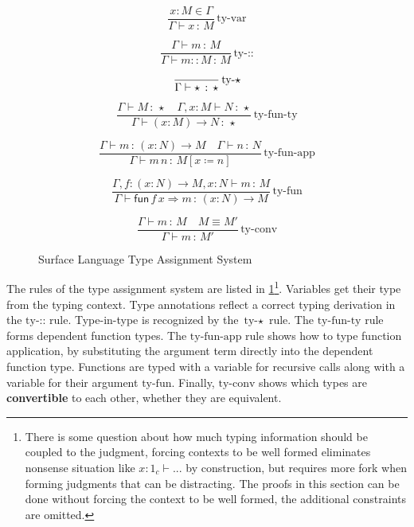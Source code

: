 

\begin{figure}
\[
\frac{x:M\in\Gamma}{\Gamma\vdash x\,:\,M}\,\textrm{ty-var}
\]

\[
\frac{\Gamma\vdash m\,:\,M}{\Gamma\vdash m::M\,:\,M}\,\textrm{ty-::}
\]

\[
\frac{{\color{gray}\ }}{\Gamma\vdash\star\,:\,\star}\,\textrm{ty-}\star
\]

\[
\frac{\Gamma\vdash M\,:\,\star\quad\Gamma,x:M\vdash N\,:\,\star}{\Gamma\vdash\left(x:M\right)\rightarrow N\,:\,\star}\,\textrm{ty-fun-ty}
\]

\[
\frac{\Gamma\vdash m\,:\,\left(x:N\right)\rightarrow M\quad\Gamma\vdash n\,:\,N}{\Gamma\vdash m\,n\,:\,M\left[x\coloneqq n\right]}\,\textrm{ty-fun-app}
\]

\[
\frac{\Gamma,f:\left(x:N\right)\rightarrow M,x:N\vdash m\,:\,M}{\Gamma\vdash\mathsf{fun}\,f\,x\Rightarrow m\,:\,\left(x:N\right)\rightarrow M}\,\textrm{ty-fun}
\]

\[
\frac{\Gamma\vdash m\,:\,M\quad M\equiv M'}{\Gamma\vdash m\,:\,M'}\,\textrm{ty-conv}
\]


\caption{Surface Language Type Assignment System}
\label{fig:surface-TAS}
\end{figure}

The rules of the type assignment system are listed in \ref{fig:surface-TAS}\footnote{There is some question about how much typing information should be
coupled to the judgment, forcing contexts to be well formed eliminates
nonsense situation like $x:1_{c}\vdash...$ by construction, but requires
more fork when forming judgments that can be distracting. The proofs
in this section can be done without forcing the context to be well
formed, the additional constraints are omitted.}. Variables get their type from the typing context. Type annotations
reflect a correct typing derivation in the $\textrm{ty-::}$ rule.
Type-in-type is recognized by the $\textrm{ty-}\star$ rule. The $\textrm{ty-fun-ty}$
rule forms dependent function types. The $\textrm{ty-fun-app}$ rule
shows how to type function application, by substituting the argument
term directly into the dependent function type. Functions are typed
with a variable for recursive calls along with a variable for their
argument $\textrm{ty-fun}$. Finally, $\textrm{ty-conv}$ shows which
types are \textbf{convertible} to each other, whether they are equivalent.

